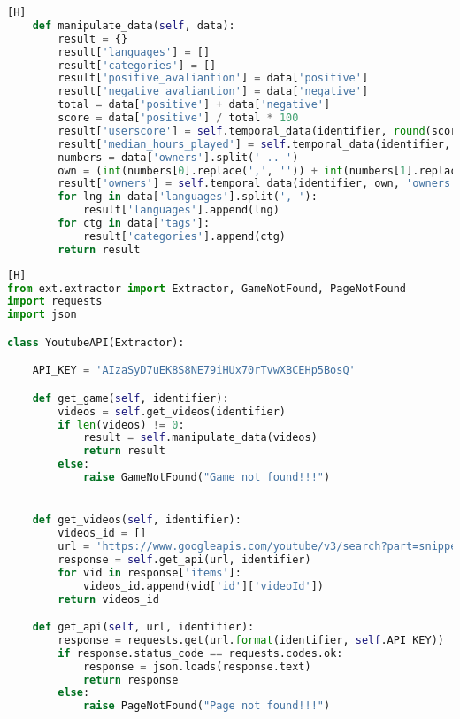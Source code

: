 \begin{anexosenv}
\begin{lstlisting}[language={Python}, caption = {Código do \textit{plugin} \textit{\textbf{Steam Spy API}}}] [H]
	def manipulate_data(self, data):
		result = {}
		result['languages'] = []
		result['categories'] = []
		result['positive_avaliantion'] = data['positive']
		result['negative_avaliantion'] = data['negative']
		total = data['positive'] + data['negative']
		score = data['positive'] / total * 100
		result['userscore'] = self.temporal_data(identifier, round(score, 2), 'userscore')
		result['median_hours_played'] = self.temporal_data(identifier, data['median_forever'] // 60, 'median_hours_played')
		numbers = data['owners'].split(' .. ')
		own = (int(numbers[0].replace(',', '')) + int(numbers[1].replace(',', ''))) // 2
		result['owners'] = self.temporal_data(identifier, own, 'owners')
		for lng in data['languages'].split(', '):
			result['languages'].append(lng)
		for ctg in data['tags']:
			result['categories'].append(ctg)
		return result
\end{lstlisting}
\begin{lstlisting}[language={Python}, caption = {Código do \textit{plugin} \textit{\textbf{Youtube API}}}] [H]
from ext.extractor import Extractor, GameNotFound, PageNotFound
import requests
import json

class YoutubeAPI(Extractor):

	API_KEY = 'AIzaSyD7uEK8S8NE79iHUx70rTvwXBCEHp5BosQ'

	def get_game(self, identifier):
		videos = self.get_videos(identifier)
		if len(videos) != 0:
			result = self.manipulate_data(videos)
			return result
		else:
			raise GameNotFound("Game not found!!!")


	def get_videos(self, identifier):	
		videos_id = []
		url = 'https://www.googleapis.com/youtube/v3/search?part=snippet&maxResults=20&q={}&type=video&key={}&order=relevance'
		response = self.get_api(url, identifier)
		for vid in response['items']:
			videos_id.append(vid['id']['videoId'])
		return videos_id

	def get_api(self, url, identifier):
		response = requests.get(url.format(identifier, self.API_KEY))
		if response.status_code == requests.codes.ok:
			response = json.loads(response.text)
			return response
		else:
			raise PageNotFound("Page not found!!!")


\end{lstlisting}
\end{anexosenv}
